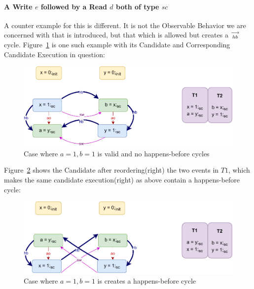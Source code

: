     \paragraph{A Write $e$ followed by a Read $d$ both of type $sc$}
        
        A counter example for this is different. 
        It is not the Observable Behavior we are concerned with that is introduced, but that which is allowed but creates a $\stackrel{\longrightarrow}{_{hb}}$ cycle. 
        Figure~\ref{reord_counter:example3(a)} is one such example with its Candidate and Corresponding Candidate Execution in question:
        \begin{figure}[H]
            \centering
            \includegraphics[scale=0.7]{5.InstructionReordering/4.ValidReorderingCandidate/Example5(Wsc-Rsc).pdf}
            \caption{Case where $a = 1, b = 1$ is valid and no happens-before cycles}
            \label{reord_counter:example3(a)}
        \end{figure}

        Figure~\ref{reord_counter:example3(b)} shows the Candidate after reordering(right) the two events in $T1$, which makes the same candidate execution(right) as above contain a happens-before cycle:
        \begin{figure}[H]
            \centering
            \includegraphics[scale=0.7]{5.InstructionReordering/4.ValidReorderingCandidate/Example5R(Wsc-Rsc).pdf}
            \caption{Case where $a = 1, b = 1$ is creates a happens-before cycle}
            \label{reord_counter:example3(b)}
        \end{figure}

